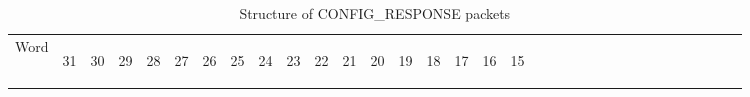 \documentclass[11pt]{article}
\begin{document}
\begin{table}[h!]
    \centering
    \caption{Structure of CONFIG\_RESPONSE packets}
    \label{tab:configResponseDef}
    \begin{tabular}{|p{1cm}|m{0.04cm}|m{0.04cm}|m{0.04cm}|m{0.04cm}|m{0.04cm}|m{0.04cm}|m{0.04cm}|m{0.04cm}|m{0.04cm}|
        m{0.04cm}|m{0.04cm}|m{0.04cm}|m{0.04cm}|m{0.04cm}|m{0.04cm}|m{0.04cm}|m{0.04cm}|m{0.04cm}|m{0.04cm}|m{0.04cm}|
        m{0.04cm}|m{0.04cm}|m{0.04cm}|m{0.04cm}|m{0.04cm}|m{0.04cm}|m{0.04cm}|m{0.04cm}|m{0.04cm}|m{0.04cm}|m{0.04cm}|m{0.04cm}|}
        \hline
        Word & 
        \begin{sideways}31\end{sideways} &
        \begin{sideways}30\end{sideways} & 
        \begin{sideways}29\end{sideways} &
        \begin{sideways}28\end{sideways} &
        \begin{sideways}27\end{sideways} &
        \begin{sideways}26\end{sideways} &
        \begin{sideways}25\end{sideways} &
        \begin{sideways}24\end{sideways} &
        \begin{sideways}23\end{sideways} &
        \begin{sideways}22\end{sideways} &
        \begin{sideways}21\end{sideways} &
        \begin{sideways}20\end{sideways} &
        \begin{sideways}19\end{sideways} &
        \begin{sideways}18\end{sideways} &
        \begin{sideways}17\end{sideways} &
        \begin{sideways}16\end{sideways} &
        \begin{sideways}15\end{sideways} &

\end{tabular}
\end{table}
\end{document}
